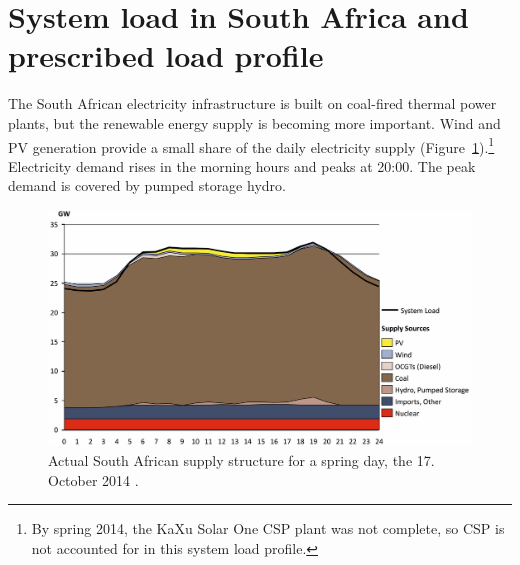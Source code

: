 \section{System load in South Africa and prescribed load profile} \label{SystemloadinSA}

The South African electricity infrastructure is built on coal-fired thermal power plants, but the renewable energy supply is becoming more important. Wind and PV generation provide a small share of the daily electricity supply (Figure~\ref{systemload}).\footnote{By spring 2014, the KaXu Solar One CSP plant was not complete, so CSP is not accounted for in this system load profile.} Electricity demand rises in the morning hours and peaks at 20:00. The peak demand is covered by pumped storage hydro. 


\begin{figure}[htbp]  
\centering
\includegraphics[width=1\linewidth]{FIG/systemload}
\caption[Actual South African supply structure for a spring day, the 17. October 2014.]{Actual South African supply structure for a spring day, the 17. October 2014 \cite{CSIR2015}.}\label{systemload}
\end{figure}

